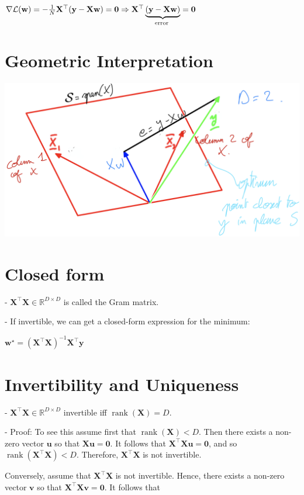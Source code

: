 $
\nabla \mathcal{L}(\mathbf{w})=-\frac{1}{N} \mathbf{X}^{\top}(\mathbf{y}-\mathbf{X} \mathbf{w}) = \mathbf{0}\\
\Rightarrow\mathbf{X}^{\top} \underbrace{(\mathbf{y}-\mathbf{X} \mathbf{w})}_{\text {error }}=\mathbf{0}
$

\section*{Geometric Interpretation}

    \includegraphics*[width=0.7\columnwidth]{figures/geom_ls.png}


\section*{Closed form}
- $\mathbf{X}^{\top} \mathbf{X} \in \mathbb{R}^{D \times D}$ is called the Gram matrix. 

- If invertible, we can get a closed-form expression for the minimum:

$
\mathbf{w}^{\star}=\left(\mathbf{X}^{\top} \mathbf{X}\right)^{-1} \mathbf{X}^{\top} \mathbf{y}
$

\section*{Invertibility and Uniqueness}
- $\mathbf{X}^{\top} \mathbf{X} \in \mathbb{R}^{D \times D}$ invertible iff $\operatorname{rank}(\mathbf{X})=D$.

- Proof: To see this assume first that $\operatorname{rank}(\mathbf{X})<D$. Then there exists a non-zero vector $\mathbf{u}$ so that $\mathbf{X u}=\mathbf{0}$. It follows that $\mathbf{X}^{\top} \mathbf{X u}=\mathbf{0}$, and so $\operatorname{rank}\left(\mathbf{X}^{\top} \mathbf{X}\right)<D$. Therefore, $\mathbf{X}^{\top} \mathbf{X}$ is not invertible.

Conversely, assume that $\mathbf{X}^{\top} \mathbf{X}$ is not invertible. Hence, there exists a non-zero vector $\mathbf{v}$ so that $\mathbf{X}^{\top} \mathbf{X v}=\mathbf{0}$. It follows that

